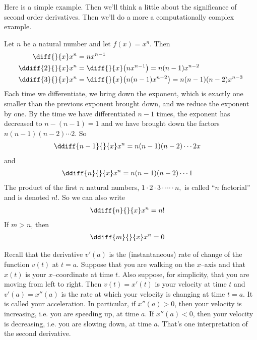 Here is a simple example. Then we'll think a little about the significance
of second order derivatives. Then we'll do a more a computationally complex
example.

\begin{eg}\label{eg:higherOrdDerivA}
Let $n$ be a natural number and let $f(x)= x^n$. Then
\begin{align*}
\diff{}{x}x^n&=nx^{n-1} \\
\ddiff{2}{}{x}x^n&=\diff{}{x}\big(nx^{n-1}\big)=n(n-1)x^{n-2} \\
\ddiff{3}{}{x}x^n&=\diff{}{x}\big(n(n-1)x^{n-2}\big)=n(n-1)(n-2)x^{n-3}
\end{align*}
Each time we differentiate, we bring down the exponent, which is exactly
one smaller than the previous exponent brought down, and we reduce the
exponent by one. By the time we have differentiated $n-1$ times,
the exponent has decreased to $n-(n-1)=1$ and we have brought down the
factors $n(n-1)(n-2)\cdots 2$. So
\begin{align*}
\ddiff{{n-1}}{}{x}x^n&=n(n-1)(n-2)\cdots 2x
\end{align*}
and
\begin{align*}
\ddiff{n}{}{x}x^n&=n(n-1)(n-2)\cdots 1
\end{align*}
The product of the first $n$ natural numbers, $1\cdot 2\cdot 3\cdot \cdots
\cdot n,$ is called ``$n$ factorial'' and is denoted $n!$. So we can also
write
\begin{align*}
\ddiff{n}{}{x}x^n&=n!
\end{align*}
If $m>n$, then
\begin{align*}
\ddiff{m}{}{x}x^n&=0
\end{align*}
\end{eg}

\begin{eg}\label{eg_2_14_1}
Recall that the derivative $v'(a)$ is the (instantaneous) rate of
change of the function $v(t)$ at $t=a$. Suppose that you are walking on
the $x$--axis and that $x(t)$ is your $x$--coordinate at time $t$.
Also suppose, for simplicity, that you are moving from left to right.
Then $v(t)=x'(t)$ is your velocity at time $t$ and $v'(a)=x''(a)$ is the
rate at which your velocity is changing at time $t=a$. It is called your
acceleration. In particular, if $x''(a)>0$, then your velocity is increasing,
i.e. you are speeding up, at time $a$. If $x''(a)<0$, then your velocity
is decreasing, i.e. you are slowing down, at time $a$. That's one
interpretation of the second derivative.
\end{eg}

